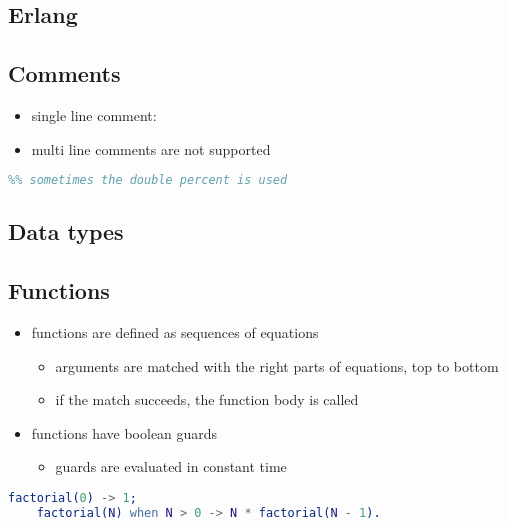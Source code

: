 \documentclass[a4paper,landscape,10pt]{article}
\begin{document}
\begin{multicols*}{2}

  \section{Erlang}

  \subsection{Comments}

  \begin{itemize}
    \item single line comment: \ierlang{\%}
    \item multi line comments are not supported
  \end{itemize}

  \begin{lstlisting}[language=Erlang]
% single line comment
%% sometimes the double percent is used
\end{lstlisting}

  \subsection{Data types}

  \missing

  \subsection{Functions}

  \begin{itemize}
    \item functions are defined as sequences of equations
          \begin{itemize}
            \item arguments are matched with the right parts of equations, top to bottom
            \item if the match succeeds, the function body is called
          \end{itemize}
    \item functions have boolean guards 
          \begin{itemize}
            \item guards are evaluated in constant time
          \end{itemize}
  \end{itemize}

  \begin{lstlisting}[language=Erlang]
    factorial(0) -> 1;
    factorial(N) when N > 0 -> N * factorial(N - 1).
  \end{lstlisting}


\end{multicols*}
\end{document}
